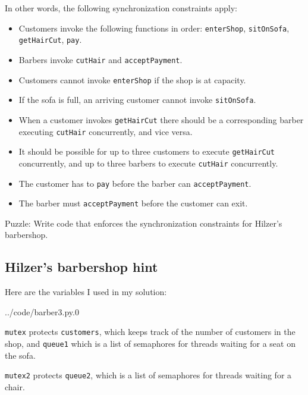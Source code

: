 \documentclass{book}
\begin{document}
In other words, the following synchronization constraints apply:

\begin{itemize}

\item Customers invoke the following functions in order:
{\tt enterShop}, {\tt sitOnSofa},
{\tt getHairCut}, {\tt pay}.

\item Barbers invoke {\tt cutHair} and {\tt acceptPayment}.

\item Customers cannot invoke {\tt enterShop} if the shop
is at capacity.

\item If the sofa is full, an arriving customer cannot invoke 
{\tt sitOnSofa}.

\item When a customer invokes {\tt getHairCut} there should be
a corresponding barber executing {\tt cutHair} concurrently,
and vice versa.

\item It should be possible for up to three customers to execute
{\tt getHairCut} concurrently, and up to three barbers to execute
{\tt cutHair} concurrently.

\item The customer has to {\tt pay} before the barber can
{\tt acceptPayment}.

\item The barber must {\tt acceptPayment} before the customer can
exit.

\end{itemize}

Puzzle: Write code that enforces the synchronization
constraints for Hilzer's barbershop.


\subsection {Hilzer's barbershop hint}

Here are the variables I used in my solution:


{../code/barber3.py.0}

{\tt mutex} protects {\tt customers}, which keeps track of the
number of customers in the shop, and {\tt queue1} which is a list
of semaphores for threads waiting for a seat on the sofa.

{\tt mutex2} protects {\tt queue2}, which is a list
of semaphores for threads waiting for a chair.
\end{document}
